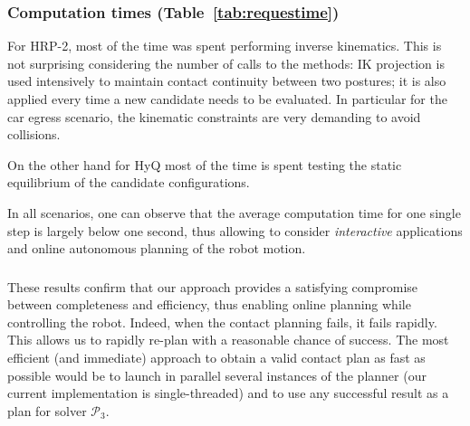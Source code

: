 \documentclass[journal]{IEEEtran}
\newcommand{\gls}[1]{\textit{#1}}
\providecommand{\DIFaddtex}[1]{#1} %
\providecommand{\DIFdeltex}[1]{} %
\providecommand{\DIFaddbegin}{\protect\color{blue}} %
\providecommand{\DIFaddend}{\protect\color{black}} %
\providecommand{\DIFdelbegin}{\protect\cbdelete} %
\providecommand{\DIFdelend}{} %
\providecommand{\DIFadd}[1]{\texorpdfstring{\DIFaddtex{#1}}{#1}} %
\providecommand{\DIFdel}[1]{\texorpdfstring{\DIFdeltex{#1}}{}} %
\begin{document}
\subsubsection{Computation times (Table~\ref{tab:requestime})}

For HRP-2, most of the time was spent performing inverse kinematics.
This is not surprising considering the number of calls to the methods: IK projection is used intensively to maintain contact continuity between two postures; 
it is also applied every time a new candidate needs to be evaluated. In particular for the car egress scenario,
the kinematic constraints are very demanding to avoid collisions.

On the other hand for HyQ most of the time is spent testing the static equilibrium of the candidate configurations.

In all scenarios, one can observe that the average computation time for one single step is largely below one second,
thus allowing to consider \gls{interactive} applications and online autonomous planning of the robot motion.

\DIFdelbegin \subsubsection{\DIFdel{Success rates (Table~\ref{tab:sucess_planning})}}
\addtocounter{subsubsection}{-1}%
\DIFdel{Despite the complexity of the scenarios and the approximations made in our formulation, our planner succeeded in the large majority of cases.
}%

\DIFdel{Table~\ref{tab:requestpercent} presents the rate of successful contact generation. Note that a failure in contact generation for a root configuration is not equivalent to a failure in the contact plan. It simply means that another limb was tested for contact generation for the same root configuration.
As expected, the more constrained scenario, the car egress, provides the less satisfying results, despite the high success rate of the planner.
}%

\DIFaddend These results confirm that our approach provides a satisfying compromise between completeness and efficiency, thus \DIFdelbegin \DIFdel{allowing to consider }\DIFdelend \DIFaddbegin \DIFadd{enabling }\DIFaddend online planning
while controlling the robot. Indeed, when the contact planning fails, it fails rapidly. This allows us to rapidly re-plan with a reasonable chance of success.
The most efficient (and immediate) approach to obtain a valid contact plan as fast as possible would be to launch in parallel several instances of the planner (our current implementation is single-threaded) and to use any successful result as a plan for solver $\mathcal{P}_3$.
\end{document}
